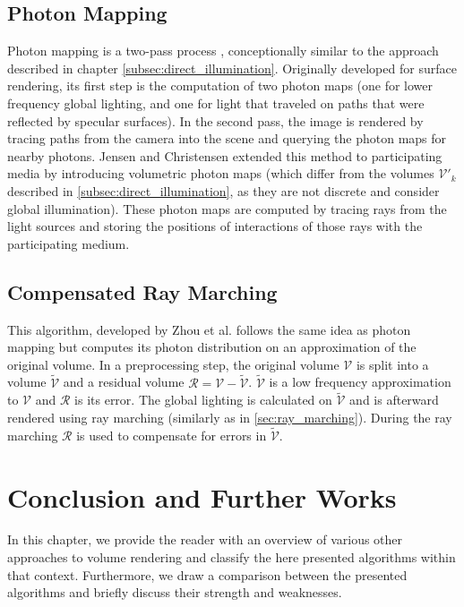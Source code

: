\subsection{Photon Mapping}
Photon mapping is a two-pass process \cite{10.1145/280814.280925}, conceptionally similar to the approach described in chapter \ref{subsec:direct_illumination}. Originally developed for surface rendering\cite{10.5555/275458.275461}, its first step is the computation of two photon maps\cite{10.1145/280814.280925} (one for lower frequency global lighting, and one for light that traveled on paths that were reflected by specular surfaces). In the second pass, the image is rendered by tracing paths from the camera into the scene and querying the photon maps for nearby photons.
Jensen and Christensen \cite{10.1145/280814.280925} extended this method to participating media by introducing volumetric photon maps (which differ from the volumes $\mathcal{V}'_k$ described in \ref{subsec:direct_illumination}, as they are not discrete and consider global illumination). These photon maps are computed by tracing rays from the light sources and storing the positions of interactions of those rays with the participating medium.
\subsection{Compensated Ray Marching}
This algorithm, developed by Zhou et al. \cite{zhou2007real-time} follows the same idea as photon mapping but computes its photon distribution on an approximation of the original volume.
In a preprocessing step, the original volume $\mathcal{V}$ is split into a volume $\widetilde{\mathcal{V}}$ and a residual volume $\mathcal{R} = \mathcal{V} - \widetilde{\mathcal{V}}$. $\widetilde{\mathcal{V}}$ is a low frequency approximation to $\mathcal{V}$ and $\mathcal{R}$ is its error. The global lighting is calculated on $\widetilde{\mathcal{V}}$ and is afterward rendered using ray marching (similarly as in \ref{sec:ray_marching}). During the ray marching $\mathcal{R}$ is used to compensate for errors in $\widetilde{\mathcal{V}}$.
\section{Conclusion and Further Works}
\label{sec:conclusion}
In this chapter, we provide the reader with an overview of various other approaches to volume rendering and classify the here presented algorithms within that context. Furthermore, we draw a comparison between the presented algorithms and briefly discuss their strength and weaknesses.
